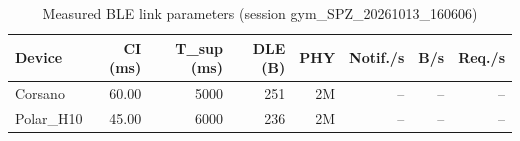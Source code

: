\begin{table}[t]
\caption{Measured BLE link parameters (session gym_SPZ_20261013_160606)}
\label{tab:link-params}
\centering
\scriptsize
\setlength{\tabcolsep}{3pt}
\begin{tabular}{lrrrrrrr}
\toprule
\textbf{Device} & \textbf{CI (ms)} & \textbf{T_sup (ms)} & \textbf{DLE (B)} & \textbf{PHY} & \textbf{Notif./s} & \textbf{B/s} & \textbf{Req./s} \\
\midrule
Corsano & 60.00 & 5000 & 251 & 2M & -- & -- & -- \\
Polar\_H10 & 45.00 & 6000 & 236 & 2M & -- & -- & -- \\
\bottomrule
\end{tabular}
\end{table}
